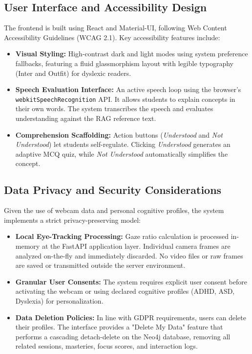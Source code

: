 \documentclass[final,5p,times,twocolumn,authoryear]{elsarticle}
\begin{document}
\subsection{User Interface and Accessibility Design}
\label{subsec:ui_accessibility}

The frontend is built using React and Material-UI, following Web Content Accessibility Guidelines (WCAG 2.1). 
Key accessibility features include:
\begin{itemize}
    \item \textbf{Visual Styling:} High-contrast dark and light modes using system preference fallbacks, featuring a fluid glassmorphism layout with legible typography (Inter and Outfit) for dyslexic readers.
    \item \textbf{Speech Evaluation Interface:} An active speech loop using the browser's \texttt{webkitSpeechRecognition} API. It allows students to explain concepts in their own words. The system transcribes the speech and evaluates understanding against the RAG reference text.
    \item \textbf{Comprehension Scaffolding:} Action buttons (\textit{Understood} and \textit{Not Understood}) let students self-regulate. Clicking \textit{Understood} generates an adaptive MCQ quiz, while \textit{Not Understood} automatically simplifies the concept.
\end{itemize}

\subsection{Data Privacy and Security Considerations}
\label{subsec:privacy_security}

Given the use of webcam data and personal cognitive profiles, the system implements a strict privacy-preserving model:
\begin{itemize}
    \item \textbf{Local Eye-Tracking Processing:} Gaze ratio calculation is processed in-memory at the FastAPI application layer. Individual camera frames are analyzed on-the-fly and immediately discarded. No video files or raw frames are saved or transmitted outside the server environment.
    \item \textbf{Granular User Consents:} The system requires explicit user consent before activating the webcam or using declared cognitive profiles (ADHD, ASD, Dyslexia) for personalization.
    \item \textbf{Data Deletion Policies:} In line with GDPR requirements, users can delete their profiles. The interface provides a "Delete My Data" feature that performs a cascading detach-delete on the Neo4j database, removing all related sessions, masteries, focus scores, and interaction logs.
\end{itemize}
\end{document}
